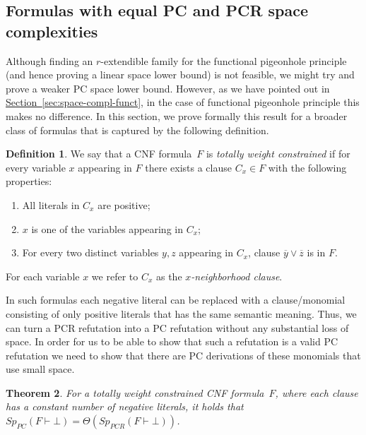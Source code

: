 \documentclass[11pt]{article}
\numberwithin{equation}{section}
\newtheorem{theorem}{Theorem}[section]
\theoremstyle{definition}
\newtheorem{definition}[theorem]{Definition}
\theoremstyle{plain}
\newcommand{\expref}[2]{\hyperref[#2]{#1~\ref{#2}}}
\theoremstyle{plain}
\theoremstyle{definition}
\newcommand{\refsec}[1]{\expref{Section}{#1}}
\newcommand{\bigtheta}[1]{\Theta ( #1 )}
\newcommand{\olnot}[1]{\overline{#1}}
\newcommand{\introduceterm}[1]{{\emph{#1}}}
\newcommand{\derivabbrevsmall}[2]{( #1 \vdash #2 )}
\newcommand{\refutabbrevsmall}[1]{\derivabbrevsmall{#1}{\!\bot}}
\newcommand{\genericrefsmall}[3]{{\mathit{#1}}_{#2}\refutabbrevsmall{#3}}
\newcommand{\mspaceref}[2][]{\genericrefsmall{Sp}{#1}{#2}}
\newcommand{\kextendiblenot}{r}
\newcommand{\kextendible}{\mbox{$\kextendiblenot$-ex}\-tend\-ible\xspace}
\newcommand{\varweightconstrained}{totally weight constrained\xspace}
\newcommand{\varneighborhoodclause}[1]{$#1$-neighborhood clause}
\begin{document}
\subsection{Formulas with equal PC and PCR space complexities}
\label{sec:varweightconstrained}


Although finding an \kextendible{} family for the functional
pigeonhole principle (and hence proving a linear space lower bound) is not
feasible, we might try and prove a weaker PC space lower
bound. However, as we have pointed out in
\refsec{sec:space-compl-funct}, in the case of functional pigeonhole
principle this makes no difference. In this section, we prove formally
this result for a broader class of formulas that is captured by the
following definition.

\begin{definition}\label{def:var-weight-constrained}
  We say that a CNF formula~$F$ is
  \introduceterm{\varweightconstrained{}} if for every variable $x$
  appearing in $F$ there exists a clause $C_x \in F$ with the
  following properties:
  \begin{enumerate}
  \item All literals in $C_x$ are positive;
  \item $x$ is one of the variables appearing in $C_x$;
  \item For every two distinct variables $y, z$ appearing in $C_x$,
    clause $\olnot{y} \lor \olnot{z}$ is in $F$.
  \end{enumerate}
  For each variable $x$ we refer to $C_x$ as the
  \introduceterm{\varneighborhoodclause{x}}.
\end{definition}

In such formulas each negative literal can be replaced with a
clause/monomial consisting of only positive literals that has the same
semantic meaning. Thus, we can turn a PCR refutation into a PC
refutation without any substantial loss of space. In order for us to
be able to show that such a refutation is a valid PC refutation we
need to show that there are PC derivations of these monomials that use
small space.

\begin{theorem}\label{th:varweightconstrained}
  For a \varweightconstrained{} CNF formula~$F$, where each clause has
  a constant number of negative literals, it holds that
  $\mspaceref[PC]{F} = \bigtheta{\mspaceref[PCR]{F}}$.
\end{theorem}

%
\end{document}
